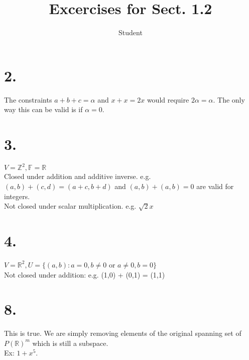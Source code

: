 \documentclass{article}
\title{Excercises for Sect. 1.2}
\author{Student}
\begin{document}
\maketitle
\section*{2.}
The constraints $a+b+c=\alpha$ and $x+x=2x$ would require $2 \alpha = \alpha$.  The only way this can be valid is if $\alpha = 0$.
\section*{3.}
$V=\mathbb{Z}^2, \mathbb{F} = \mathbb{R}$\\
Closed under addition and additive inverse. e.g. $(a,b) + (c,d) = (a +c, b + d)$ and $(a,b) + (a, b) = 0$ are valid for integers.\\ 
Not closed under scalar multiplication. e.g. $\sqrt{2}x$
\section*{4.}
$V=\mathbb{R}^2,U=\{(a,b): a=0, b\ne0$ or $a \ne 0, b=0\}$\\
Not closed under addition: e.g. (1,0) + (0,1) = (1,1)
\section*{8.}
This is true.  We are simply removing elements of the  original spanning set of $P(\mathbb{R})^m$ which is still a subspace.\\
Ex: $1 + x^5$.\\
\end{document}
